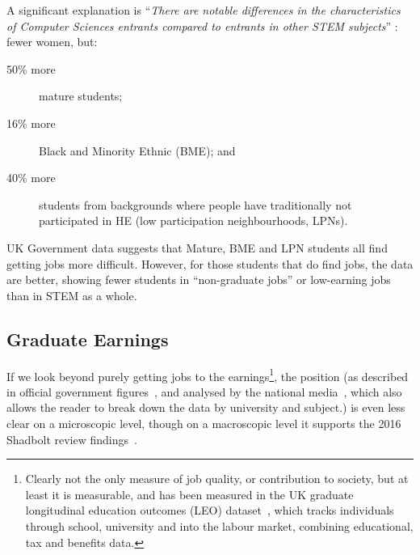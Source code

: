 \documentclass[sigconf,anonymous]{acmart}
\begin{document}
A significant explanation is ``{\emph{There are notable differences in the
characteristics of Computer Sciences entrants compared to entrants in
other STEM subjects}}'' \cite[\P2.6]{Shadbolt2016a}: fewer women, but:

\begin{description}
\item[50\% more] mature students;
\item[16\% more] Black and Minority Ethnic (BME); and
\item[40\% more] students from backgrounds where people have
traditionally not participated in HE (low participation
neighbourhoods, LPNs).
\end{description}

UK Government data suggests that Mature, BME and LPN students all find
getting jobs more difficult. However, for those students that do find
jobs, the data are better, showing \cite[Figure 6]{Shadbolt2016a}
fewer students in ``non-graduate jobs'' or low-earning jobs than in
STEM as a whole.

\subsection{Graduate Earnings}
If we look beyond purely getting jobs to the earnings\footnote{Clearly
not the only measure of job quality, or contribution to society, but
at least it is measurable, and has been measured in the UK graduate
longitudinal education outcomes (LEO) dataset~\cite{DfE2017a}, which
tracks individuals through school, university and into the labour
market, combining educational, tax and benefits data.}, the position
(as described in official government figures~\cite{DfE2018d}, and
analysed by the national media~\cite{BBC2018f}, which also allows the
reader to break down the data by university and subject.) is even less
clear on a microscopic level, though on a macroscopic level it
supports the 2016 Shadbolt review findings~\cite{Shadbolt2016a}.
\end{document}
